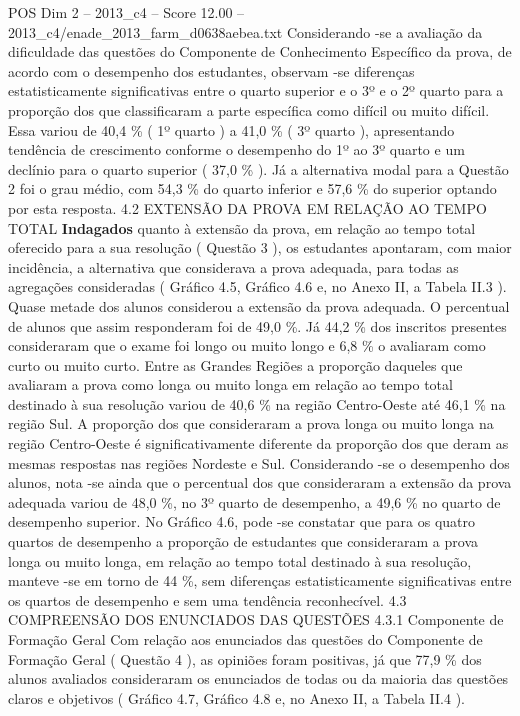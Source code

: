 \begin{textsample}{POS Dim 2 – 2013\_c4 – Score 12.00 – 2013\_c4/enade\_2013\_farm\_d0638aebea.txt}
Considerando -se a avaliação da dificuldade das questões do Componente de Conhecimento Específico da prova, de acordo com o desempenho dos estudantes, observam -se diferenças estatisticamente significativas entre o quarto superior e o 3º e o 2º quarto para a proporção dos que classificaram a parte específica como difícil ou muito difícil.
Essa variou de 40,4 \% ( 1º quarto ) a 41,0 \% ( 3º quarto ), apresentando tendência de crescimento conforme o desempenho do 1º ao 3º quarto e um declínio para o quarto superior ( 37,0 \% ).
Já a alternativa modal para a Questão 2 foi o grau médio, com 54,3 \% do quarto inferior e 57,6 \% do superior optando por esta resposta. 4.2 EXTENSÃO DA PROVA EM RELAÇÃO AO TEMPO TOTAL \textbf{Indagados} quanto à extensão da prova, em relação ao tempo total oferecido para a sua resolução ( Questão 3 ), os estudantes apontaram, com maior incidência, a alternativa que considerava a prova adequada, para todas as agregações consideradas ( Gráfico 4.5, Gráfico 4.6 e, no Anexo II, a Tabela II.3 ).
Quase metade dos alunos considerou a extensão da prova adequada.
O percentual de alunos que assim responderam foi de 49,0 \%.
Já 44,2 \% dos inscritos presentes consideraram que o exame foi longo ou muito longo e 6,8 \% o avaliaram como curto ou muito curto.
Entre as Grandes Regiões a proporção daqueles que avaliaram a prova como longa ou muito longa em relação ao tempo total destinado à sua resolução variou de 40,6 \% na região Centro-Oeste até 46,1 \% na região Sul.
A proporção dos que consideraram a prova longa ou muito longa na região Centro-Oeste é significativamente diferente da proporção dos que deram as mesmas respostas nas regiões Nordeste e Sul.
Considerando -se o desempenho dos alunos, nota -se ainda que o percentual dos que consideraram a extensão da prova adequada variou de 48,0 \%, no 3º quarto de desempenho, a 49,6 \% no quarto de desempenho superior.
No Gráfico 4.6, pode -se constatar que para os quatro quartos de desempenho a proporção de estudantes que consideraram a prova longa ou muito longa, em relação ao tempo total destinado à sua resolução, manteve -se em torno de 44 \%, sem diferenças estatisticamente significativas entre os quartos de desempenho e sem uma tendência reconhecível. 4.3 COMPREENSÃO DOS ENUNCIADOS DAS QUESTÕES 4.3.1 Componente de Formação Geral Com relação aos enunciados das questões do Componente de Formação Geral ( Questão 4 ), as opiniões foram positivas, já que 77,9 \% dos alunos avaliados consideraram os enunciados de todas ou da maioria das questões claros e objetivos ( Gráfico 4.7, Gráfico 4.8 e, no Anexo II, a Tabela II.4 ).

\end{textsample}
